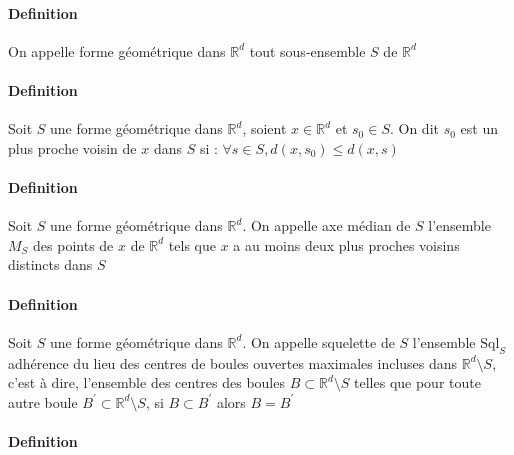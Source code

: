 ﻿\documentclass{article}
\begin{document}
\paragraph{Definition} On appelle forme géométrique dans $\mathbb{R}^d$ tout sous-ensemble $S$ de $\mathbb{R}^d$
\paragraph{Definition} Soit $S$ une forme géométrique dans $\mathbb{R}^d$, soient $x\in\mathbb{R}^d$ et $s_0\in S$. On dit $s_0$ est un plus proche voisin de $x$ dans $S$ si : $\forall s\in S, d(x, s_0) \leq d(x, s)$
\paragraph{Definition} Soit $S$ une forme géométrique dans $\mathbb{R}^d$. On appelle axe médian de $S$ l'ensemble $M_S$ des points de $x$ de $\mathbb{R}^d$ tels que $x$ a au moins deux plus proches voisins distincts dans $S$
\paragraph{Definition} Soit $S$ une forme géométrique dans $\mathbb{R}^d$. On appelle squelette de $S$ l'ensemble $\mathrm{Sql}_S$ adhérence du lieu des centres de boules ouvertes maximales incluses dans $\mathbb{R}^d\setminus S$, c'est à dire, l'ensemble des centres des boules $B\subset\mathbb{R}^d\setminus S$ telles que pour toute autre boule $B^\prime\subset\mathbb{R}^d\setminus S$, si $B\subset B^\prime$ alors $B=B^\prime$
\paragraph{Definition}
\end{document}

